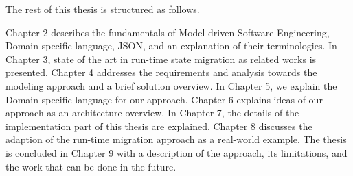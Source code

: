 The rest of this thesis is structured as follows.

Chapter 2 describes the fundamentals of Model-driven Software Engineering, Domain-specific language, JSON, and an explanation of their terminologies. In Chapter 3, state of the art in run-time state migration as related works is presented. Chapter 4 addresses the requirements and analysis towards the modeling approach and a brief solution overview. In Chapter 5, we explain the Domain-specific language for our approach. Chapter 6 explains ideas of our approach as an architecture overview. In Chapter 7, the details of the implementation part of this thesis are explained. Chapter 8 discusses the adaption of the run-time migration approach as a real-world example. The thesis is concluded in Chapter 9 with a description of the approach, its limitations, and the work that can be done in the future.